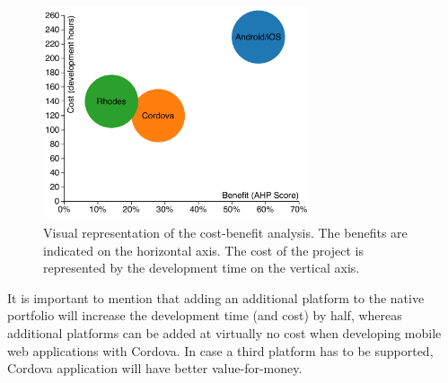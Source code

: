 \begin{figure}
    \centering
    \includegraphics[width=0.7\textwidth]{../resources/figs/benefit-cost.pdf}
    \caption{Visual representation of the cost-benefit analysis. The benefits are indicated on the horizontal axis. The cost of the project is represented by the development time on the vertical axis.}
    \label{fig:cost-benefit}
\end{figure}

It is important to mention that adding an additional platform to the native portfolio will increase the development time (and cost) by half, whereas additional platforms can be added at virtually no cost when developing mobile web applications with Cordova. In case a third platform has to be supported, Cordova application will have better value-for-money.
